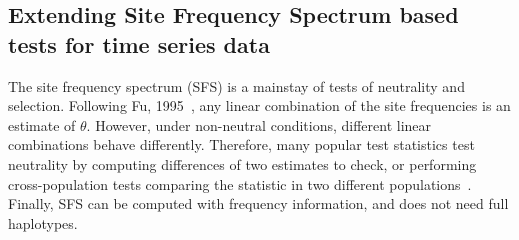 \documentclass[11pt]{article}
\begin{document}
\subsection{Extending Site Frequency Spectrum  based tests for  time series data}
\label{sec:sfs-ts}
The site frequency spectrum (SFS) is a mainstay of tests of neutrality
and selection. Following Fu, 1995~\cite{XXX}, any linear combination
of the site frequencies is an estimate of $\theta$. However, under
non-neutral conditions, different linear combinations behave
differently. Therefore, many popular test statistics test neutrality
by computing differences of two estimates to check, or performing
cross-population tests comparing the statistic in two different
populations~\cite{Achasz,Ronen,XPEHH}. Finally, SFS can be computed
with frequency information, and does not need full haplotypes.
\end{document}
